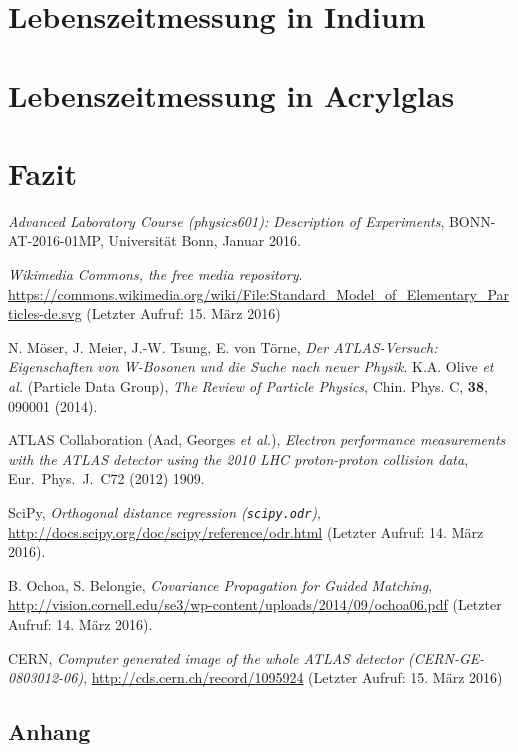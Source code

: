 \documentclass[11pt, a4paper]{article}
\numberwithin{equation}{section}
\begin{document}
\section{Lebenszeitmessung in Indium}

\section{Lebenszeitmessung in Acrylglas}

\section{Fazit}

\FloatBarrier
\vspace{\fill}
\begin{thebibliography}{19}
	\emph{Advanced Laboratory Course (physics601): Description of Experiments},
	BONN-AT-2016-01MP, Universität Bonn, Januar 2016.

	\emph{Wikimedia Commons, the free media repository}. \url{https://commons.wikimedia.org/wiki/File:Standard_Model_of_Elementary_Particles-de.svg} (Letzter Aufruf: 15. März 2016)
	
	N. Möser, J. Meier, J.-W. Tsung, E. von Törne,
	\emph{Der ATLAS-Versuch: Eigenschaften von W-Bosonen und die Suche nach neuer Physik}.
	K.A. Olive \textit{et al.} (Particle Data Group),
	\emph{The Review of Particle Physics},
	Chin. Phys. C, \textbf{38}, 090001 (2014).

	ATLAS Collaboration (Aad, Georges \textit{et al.}),
	\emph{Electron performance measurements with the ATLAS detector using the 2010 LHC proton-proton collision data},
	Eur.\ Phys.\ J.\ C72 (2012) 1909.

	SciPy,
	\emph{Orthogonal distance regression (\texttt{scipy.odr})},
	\url{http://docs.scipy.org/doc/scipy/reference/odr.html} (Letzter Aufruf: 14. März 2016).

	B. Ochoa, S. Belongie,
	\emph{Covariance Propagation for Guided Matching},
	\url{http://vision.cornell.edu/se3/wp-content/uploads/2014/09/ochoa06.pdf} (Letzter Aufruf: 14. März 2016).
	
	CERN, \emph{Computer generated image of the whole ATLAS detector (CERN-GE-0803012-06)}, \url{http://cds.cern.ch/record/1095924} (Letzter Aufruf: 15. März 2016)
\end{thebibliography}

\begin{appendix}
\newpage
\section{Anhang}


\end{appendix}
\end{document}
